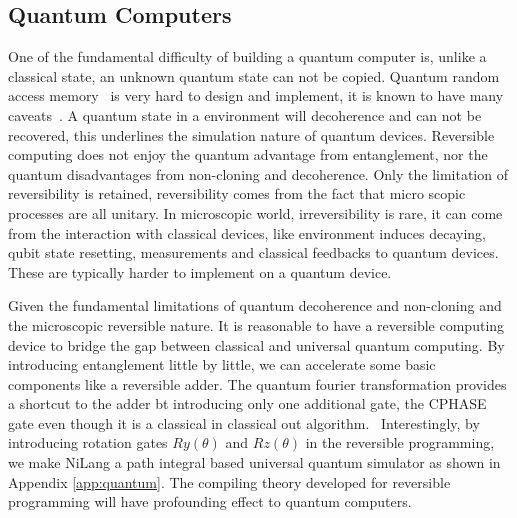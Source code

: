 \documentclass[aps,twocolumn,longbibliography,english,superscriptaddress,prr]{revtex4-1}
\newcommand{\<}{\langle}
\renewcommand{\>}{\rangle}
\newcommand{\App}[1]{Appendix \ref{#1}}
\theoremstyle{definition}\newtheorem{definition}{\textit{Definition}}
\begin{document}
\subsection{Quantum Computers}\label{sec:qc}
One of the fundamental difficulty of building a quantum computer is, unlike a classical state, an unknown quantum state can not be copied.
Quantum random access memory~\cite{Giovannetti2008} is very hard to design and implement, it is known to have many caveats~\cite{Aaronson2015}.
A quantum state in a environment will decoherence and can not be recovered, this underlines the simulation nature of quantum devices.
Reversible computing does not enjoy the quantum advantage from entanglement, nor the quantum disadvantages from non-cloning and decoherence.
Only the limitation of reversibility is retained, reversibility comes from the fact that micro scopic processes are all unitary.
In microscopic world, irreversibility is rare, it can come from the interaction with classical devices, like environment induces decaying, qubit state resetting, measurements and classical feedbacks to quantum devices. These are typically harder to implement on a quantum device.

Given the fundamental limitations of quantum decoherence and non-cloning and the microscopic reversible nature.
It is reasonable to have a reversible computing device to bridge the gap between classical and universal quantum computing.
By introducing entanglement little by little, we can accelerate some basic components like a reversible adder.
The quantum fourier transformation provides a shortcut to the adder bt introducing only one additional gate, the CPHASE gate even though it is a classical in classical out algorithm.~\cite{} Interestingly, by introducing rotation gates $Ry(\theta)$ and $Rz(\theta)$ in the reversible programming, we make NiLang a path integral based universal quantum simulator as shown in \App{app:quantum}. The compiling theory developed for reversible programming will have profounding effect to quantum computers.
\end{document}
